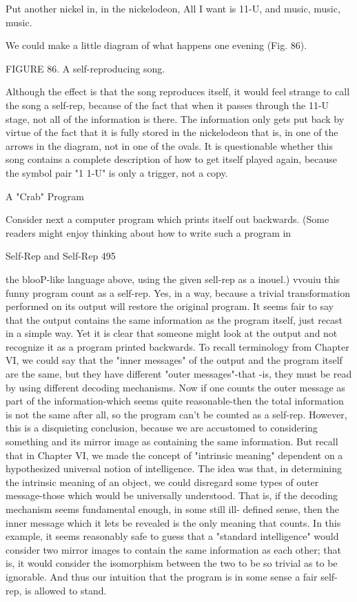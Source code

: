 {                          Put another nickel in, in the nickelodeon,
                         All I want is 11-U, and music, music, music.

We could make a little diagram of what happens one evening (Fig. 86).




FIGURE 86. A self-reproducing song.

Although the effect is that the song reproduces itself, it would feel strange to call the song a
self-rep, because of the fact that when it passes through the 11-U stage, not all of the
information is there. The information only gets put back by virtue of the fact that it is fully
stored in the nickelodeon that is, in one of the arrows in the diagram, not in one of the ovals.
It is questionable whether this song contains a complete description of how to get itself
played again, because the symbol pair "1 1-U" is only a trigger, not a copy.

                                     A "Crab" Program

Consider next a computer program which prints itself out backwards. (Some readers might
enjoy thinking about how to write such a program in




Self-Rep and Self-Rep                                                                       495

the blooP-like language above, using the given sell-rep as a inouel.) vvouiu this funny
program count as a self-rep. Yes, in a way, because a trivial transformation performed on its
output will restore the original program. It seems fair to say that the output contains the same
information as the program itself, just recast in a simple way. Yet it is clear that someone
might look at the output and not recognize it as a program printed backwards. To recall
terminology from Chapter VI, we could say that the "inner messages" of the output and the
program itself are the same, but they have different "outer messages"-that -is, they must be
read by using different decoding mechanisms. Now if one counts the outer message as part of
the information-which seems quite reasonable-then the total information is not the same after
all, so the program can't be counted as a self-rep.
         However, this is a disquieting conclusion, because we are accustomed to considering
something and its mirror image as containing the same information. But recall that in Chapter
VI, we made the concept of "intrinsic meaning" dependent on a hypothesized universal
notion of intelligence. The idea was that, in determining the intrinsic meaning of an object,
we could disregard some types of outer message-those which would be universally
understood. That is, if the decoding mechanism seems fundamental enough, in some still ill-
defined sense, then the inner message which it lets be revealed is the only meaning that
counts. In this example, it seems reasonably safe to guess that a "standard intelligence" would
consider two mirror images to contain the same information as each other; that is, it would
consider the isomorphism between the two to be so trivial as to be ignorable. And thus our
intuition that the program is in some sense a fair self-rep, is allowed to stand.

}
